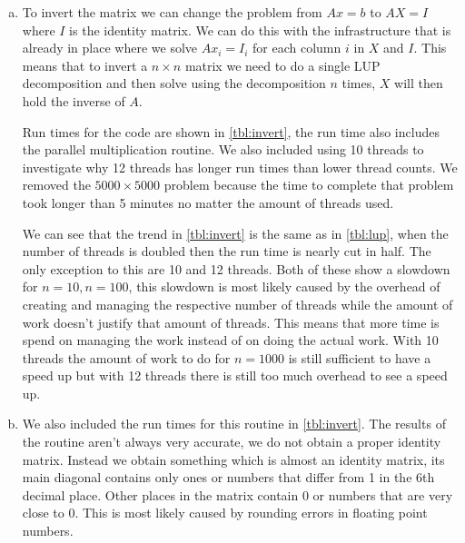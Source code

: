\documentclass[a4paper]{article}
\begin{document}
\begin{enumerate}[(a)]
	\item To invert the matrix we can change the problem from $Ax=b$ to $AX=I$ where $I$ is the identity matrix. We can do this with the infrastructure that is already in place where we solve $Ax_i = I_i$ for each column $i$ in $X$ and $I$. This means that to invert a $n \times n$ matrix we need to do a single LUP decomposition and then solve using the decomposition $n$ times, $X$ will then hold the inverse of $A$.
	
	Run times for the code are shown in \autoref{tbl:invert}, the run time also includes the parallel multiplication routine. We also included using 10 threads to investigate why 12 threads has longer run times than lower thread counts. We removed the $5000 \times 5000$ problem because the time to complete that problem took longer than 5 minutes no matter the amount of threads used.
	
	We can see that the trend in \autoref{tbl:invert} is the same as in \autoref{tbl:lup}, when the number of threads is doubled then the run time is nearly cut in half. The only exception to this are 10 and 12 threads. Both of these show a slowdown for $n=10, n=100$, this slowdown is most likely caused by the overhead of creating and managing the respective number of threads while the amount of work doesn't justify that amount of threads. This means that more time is spend on managing the work instead of on doing the actual work. With 10 threads the amount of work to do for $n=1000$ is still sufficient to have a speed up but with 12 threads there is still too much overhead to see a speed up.
	
	\item We also included the run times for this routine in \autoref{tbl:invert}. The results of the routine aren't always very accurate, we do not obtain a proper identity matrix. Instead we obtain something which is almost an identity matrix, its main diagonal contains only ones or numbers that differ from 1 in the 6th decimal place. Other places in the matrix contain 0 or numbers that are very close to 0. This is most likely caused by rounding errors in floating point numbers.
\end{enumerate}
\end{document}
